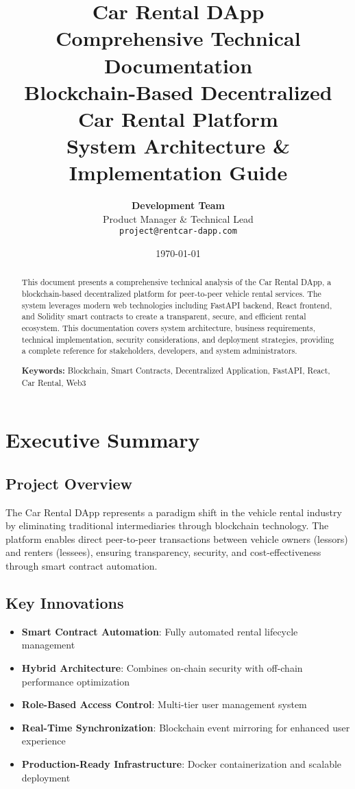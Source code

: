 \documentclass[12pt,a4paper]{article}
\title{
    \vspace{-2cm}
    \Huge\textbf{Car Rental DApp}\\
    \Large\textbf{Comprehensive Technical Documentation}\\
    \vspace{0.5cm}
    \large Blockchain-Based Decentralized Car Rental Platform\\
    \normalsize System Architecture \& Implementation Guide
}
\author{
    \textbf{Development Team}\\
    Product Manager \& Technical Lead\\
    \texttt{project@rentcar-dapp.com}
}
\date{\today}
\begin{document}
\maketitle
\thispagestyle{empty}

\newpage
\tableofcontents
\newpage

\begin{abstract}
This document presents a comprehensive technical analysis of the Car Rental DApp, a blockchain-based decentralized platform for peer-to-peer vehicle rental services. The system leverages modern web technologies including FastAPI backend, React frontend, and Solidity smart contracts to create a transparent, secure, and efficient rental ecosystem. This documentation covers system architecture, business requirements, technical implementation, security considerations, and deployment strategies, providing a complete reference for stakeholders, developers, and system administrators.

\textbf{Keywords:} Blockchain, Smart Contracts, Decentralized Application, FastAPI, React, Car Rental, Web3
\end{abstract}

\section{Executive Summary}

\subsection{Project Overview}
The Car Rental DApp represents a paradigm shift in the vehicle rental industry by eliminating traditional intermediaries through blockchain technology. The platform enables direct peer-to-peer transactions between vehicle owners (lessors) and renters (lessees), ensuring transparency, security, and cost-effectiveness through smart contract automation.

\subsection{Key Innovations}
\begin{itemize}
    \item \textbf{Smart Contract Automation}: Fully automated rental lifecycle management
    \item \textbf{Hybrid Architecture}: Combines on-chain security with off-chain performance optimization
    \item \textbf{Role-Based Access Control}: Multi-tier user management system
    \item \textbf{Real-Time Synchronization}: Blockchain event mirroring for enhanced user experience
    \item \textbf{Production-Ready Infrastructure}: Docker containerization and scalable deployment
\end{itemize}
\end{document}
